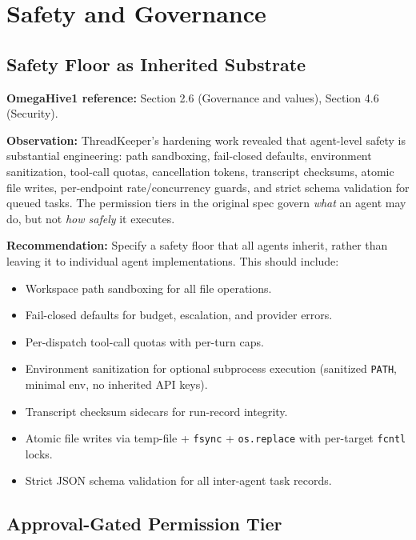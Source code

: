 \documentclass[11pt,a4paper]{article}
\begin{document}
\section{Safety and Governance}

\subsection{Safety Floor as Inherited Substrate}
\label{sec:safety-floor}

\textbf{OmegaHive1 reference:} Section 2.6 (Governance and values), Section 4.6 (Security).

\textbf{Observation:} ThreadKeeper's hardening work revealed that agent-level
safety is substantial engineering: path sandboxing, fail-closed defaults,
environment sanitization, tool-call quotas, cancellation tokens, transcript
checksums, atomic file writes, per-endpoint rate/concurrency guards, and
strict schema validation for queued tasks. The permission tiers in the
original spec govern \emph{what} an agent may do, but not \emph{how safely}
it executes.

\textbf{Recommendation:} Specify a safety floor that all agents inherit,
rather than leaving it to individual agent implementations. This should
include:

\begin{itemize}[nosep]
  \item Workspace path sandboxing for all file operations.
  \item Fail-closed defaults for budget, escalation, and provider errors.
  \item Per-dispatch tool-call quotas with per-turn caps.
  \item Environment sanitization for optional subprocess execution
    (sanitized \texttt{PATH}, minimal env, no inherited API keys).
  \item Transcript checksum sidecars for run-record integrity.
  \item Atomic file writes via temp-file + \texttt{fsync} + \texttt{os.replace}
    with per-target \texttt{fcntl} locks.
  \item Strict JSON schema validation for all inter-agent task records.
\end{itemize}

\subsection{Approval-Gated Permission Tier}
\label{sec:approval-gated}
\end{document}
